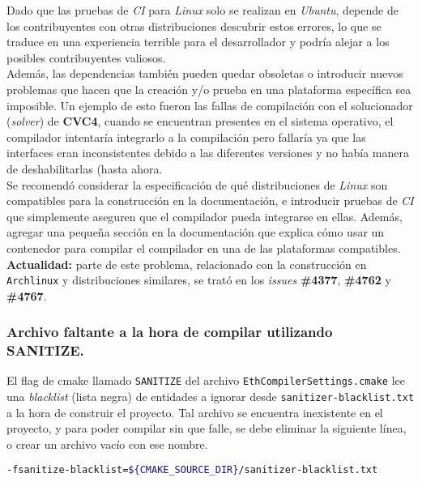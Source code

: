 Dado que las pruebas de \textit{CI} para \textit{Linux} solo se realizan en \textit{Ubuntu}, depende de los contribuyentes con otras distribuciones descubrir estos errores, lo que se traduce en una experiencia terrible para el desarrollador y podría alejar a los posibles contribuyentes valiosos.\\

Además, las dependencias también pueden quedar obsoletas o introducir nuevos problemas que hacen que la creación y/o prueba en una plataforma específica sea imposible. Un ejemplo de esto fueron las fallas de compilación con el solucionador (\textit{solver}) de \textbf{CVC4}, cuando se encuentran presentes en el sistema operativo, el compilador intentaría integrarlo a la compilación pero fallaría ya que las interfaces eran inconsistentes debido a las diferentes versiones y no había manera de deshabilitarlas (hasta ahora\cite{GHPR4767}.\\

Se recomendó considerar la especificación de qué distribuciones de \textit{Linux} son compatibles para la construcción en la documentación, e introducir pruebas de \textit{CI} que simplemente aseguren que el compilador pueda integrarse en ellas. Además, agregar una pequeña sección en la documentación que explica cómo usar un contenedor para compilar el compilador en una de las plataformas compatibles.\\

\textbf{Actualidad:} parte de este problema, relacionado con la construcción en \texttt{Archlinux} y distribuciones similares, se trató en los \textit{issues} \textbf{\#4377}\cite{GHI4377}, \textbf{\#4762}\cite{GHI4762} y \textbf{\#4767}\cite{GHI4767}.\\


\subsubsection{Archivo faltante a la hora de compilar utilizando SANITIZE.}

El flag de cmake llamado \verb|SANITIZE| del archivo \verb|EthCompilerSettings.cmake|\cite{SolidityEthCompilerSettings} lee una \textit{blacklist} (lista negra) de entidades a ignorar desde \verb|sanitizer-blacklist.txt|  a la hora de construir el proyecto. Tal archivo se encuentra inexistente en el proyecto, y para poder compilar sin que falle, se debe eliminar la siguiente línea, o crear un archivo vacío con ese nombre.

\begin{lstlisting}[language=bash]
-fsanitize-blacklist=${CMAKE_SOURCE_DIR}/sanitizer-blacklist.txt
\end{lstlisting}

